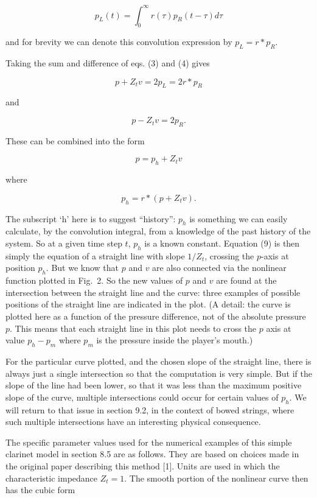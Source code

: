   $$p_L(t)=\int_0^\infty{r(\tau) p_R(t-\tau) d \tau} \tag{6}$$ 

  and for brevity we can denote this convolution expression by $p_L=r*p_R$. 

  Taking the sum and difference of eqs. (3) and (4) gives 

  $$p+Z_t v=2 p_L=2r*p_R \tag{7}$$ 

  and 

  $$p-Z_t v=2p_R . \tag{8}$$ 

  These can be combined into the form 

  $$p=p_h + Z_t v \tag{9}$$ 

  where 

  $$p_h=r*(p+Z_t v). \tag{10}$$ 

  The subscript `h' here is to suggest ``history'': $p_h$ is something we can 
  easily calculate, by the convolution integral, from a knowledge of the past 
  history of the system. So at a given time step $t$, $p_h$ is a known 
  constant. Equation (9) is then simply the equation of a straight line with 
  slope $1/Z_t$, crossing the $p$-axis at position $p_h$. But we know that $p$ 
  and $v$ are also connected via the nonlinear function plotted in Fig.\ 2. So 
  the new values of $p$ and $v$ are found at the intersection between the 
  straight line and the curve: three examples of possible positions of the 
  straight line are indicated in the plot. (A detail: the curve is plotted here 
  as a function of the pressure difference, not of the absolute pressure $p$. 
  This means that each straight line in this plot needs to cross the $p$ axis 
  at value $p_h-p_m$ where $p_m$ is the pressure inside the player's mouth.) 


  For the particular curve plotted, and the chosen slope of the straight line, 
  there is always just a single intersection so that the computation is very 
  simple. But if the slope of the line had been lower, so that it was less than 
  the maximum positive slope of the curve, multiple intersections could occur 
  for certain values of $p_h$. We will return to that issue in section 9.2, in 
  the context of bowed strings, where such multiple intersections have an 
  interesting physical consequence. 

  The specific parameter values used for the numerical examples of this simple 
  clarinet model in section 8.5 are as follows. They are based on choices made 
  in the original paper describing this method [1]. Units are used in which the 
  characteristic impedance $Z_t=1$. The smooth portion of the nonlinear curve 
  then has the cubic form 

